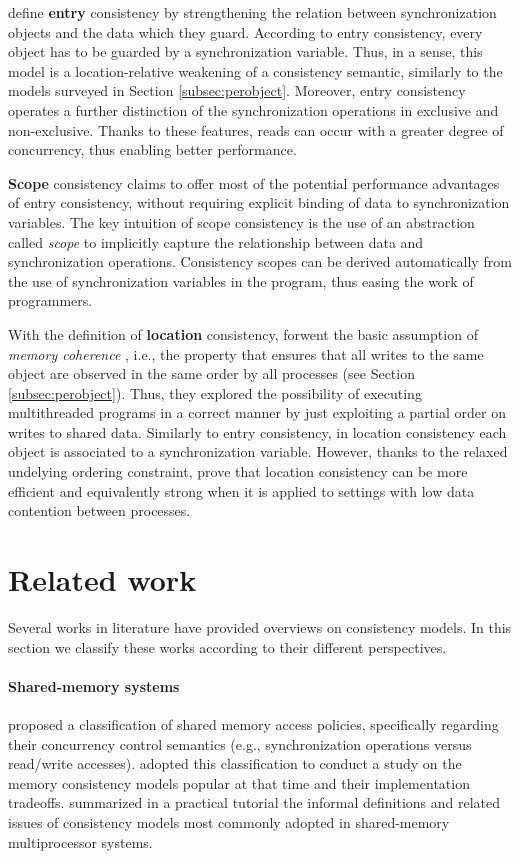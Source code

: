 \documentclass[letter, 11pt]{article}
\newcommand{\citeN}{\citet}
\renewcommand{\cite}{\citep}
\begin{document}
\citeN{Bershad.Zekauskas:91} define \textbf{entry} consistency by strengthening the 
relation between synchronization objects and the data which they guard.
According to entry consistency, every object has to be guarded by a synchronization variable.
Thus, in a sense, this model is a location-relative weakening of a consistency semantic, similarly to the models surveyed in Section \ref{subsec:perobject}.
Moreover, entry consistency operates a further distinction of the synchronization operations
in exclusive and non-exclusive.
Thanks to these features, 
reads can occur with a greater degree of concurrency, thus
enabling better performance.

\textbf{Scope} consistency \cite{Iftode.Jaswinder.ea:96} claims 
to offer most of the potential performance advantages
of entry consistency, without requiring explicit binding of data to synchronization variables.
The key intuition of scope consistency is the use of an abstraction called \emph{scope} to implicitly capture the relationship
between data and synchronization operations.
Consistency scopes can be derived automatically from the use of synchronization variables in the program,
thus easing the work of programmers.

With the definition of \textbf{location} consistency, \citeN{Gao.Sarkar:00} forwent the basic 
assumption of \emph{memory coherence} \cite{Gharachorloo.Lenoski.ea:90}, 
i.e., the property that ensures that all writes to the same object are observed in the same order by all processes (see Section \ref{subsec:perobject}).
Thus, they explored the possibility of executing multithreaded programs in a correct manner by just 
exploiting a partial order on writes to shared data.
Similarly to entry consistency, in location consistency each object is associated to 
a synchronization variable. However, thanks to the relaxed undelying ordering constraint, 
\citeN{Gao.Sarkar:00} prove that location consistency can be more efficient and equivalently strong 
when it is applied to settings with low data contention between processes.

 
\section{Related work}
\label{sec:relwork}
Several works in literature have provided overviews on consistency models.
In this section we classify these works according to their different perspectives.


\paragraph*{Shared-memory systems}
\citeN{Gharachorloo.Lenoski.ea:90} proposed
a classification of shared memory access policies, 
specifically regarding their concurrency control semantics 
(e.g., synchronization operations versus read/write accesses). 
\citeN{Mosberger:93} adopted this classification to 
conduct a study on the memory consistency models popular at that time
and their implementation tradeoffs.
\citeN{Adve.Gharachorloo:96} summarized in a practical tutorial 
the informal definitions and related issues of consistency models most commonly adopted 
in shared-memory multiprocessor systems.
\end{document}
